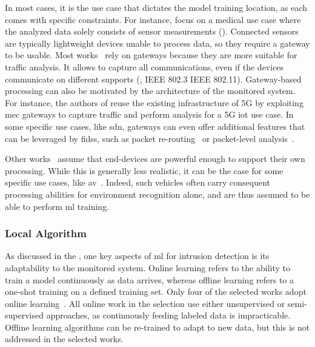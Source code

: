 In most cases, it is the use case that dictates the model training location, as each comes with specific constraints.
For instance, \textcite{zhang_BlockchainbasedFederatedLearning_2020} focus on a medical use case where the analyzed data solely consists of sensor measurements ().
Connected sensors are typically lightweight devices unable to process data, so they require a gateway to be usable.
Most works~\cite{li_DeepFedFederatedDeep_2020,chen_Networkanomalydetection_2020,schneble_Attackdetectionusing_2019,zhao_MultiTaskNetworkAnomaly_2019,al-athbaal-marri_FederatedMimicLearning_2020,kim_CollaborativeAnomalyDetection_2020,chen_Networkanomalydetection_2020,popoola_FederatedDeepLearning_2021a} rely on gateways because they are more suitable for traffic analysis.
It allows to capture all communications, even if the devices communicate on different supports (\eg, IEEE 802.3 \vs IEEE 802.11).
Gateway-based processing can also be motivated by the architecture of the monitored system.
For instance, the authors of \cite{fan_IoTDefenderFederatedTransfer_2020} reuse the existing infrastructure of 5G by exploiting \gls{mec} gateways to capture traffic and perform analysis for a 5G \gls{iot} use case.
In some specific use cases, like \gls{sdn}, gateways can even offer additional features that can be leveraged by \glspl{fids}, such as packet re-routing~\cite{rathore_BlockSecIoTNetBlockchainbaseddecentralized_2019} or packet-level analysis~\cite{qin_LineSpeedScalableIntrusion_2020}.

Other works~\cite{pahl_AllEyesYou_2018,hei_trustedfeatureaggregator_2020,qin_FederatedLearningBasedNetwork_2021,rahman_InternetThingsIntrusion_2020} assume that end-devices are powerful enough to support their own processing.
While this is generally less realistic, it can be the case for some specific use cases, like \gls{av}~\cite{liu_BlockchainFederatedLearning_2021}.
Indeed, such vehicles often carry consequent processing abilities for environment recognition alone, and are thus assumed to be able to perform \gls{ml} training.


\subsubsection{Local Algorithm\label{sec:sota.quali.alg}}

As discussed in the , one key aspects of \gls{ml} for intrusion detection is its adaptability to the monitored system.
Online learning refers to the ability to train a model continuously as data arrives, whereas offline learning refers to a one-shot training on a defined training set.
Only four of the selected works adopt online learning~\cite{pahl_AllEyesYou_2018,nguyen_DIoTFederatedSelflearning_2019,schneble_Attackdetectionusing_2019,hei_trustedfeatureaggregator_2020}.
All online work in the selection use either unsupervised or semi-supervised approaches, as continuously feeding labeled data is impracticable.
Offline learning algorithms can be re-trained to adapt to new data, but this is not addressed in the selected works.

